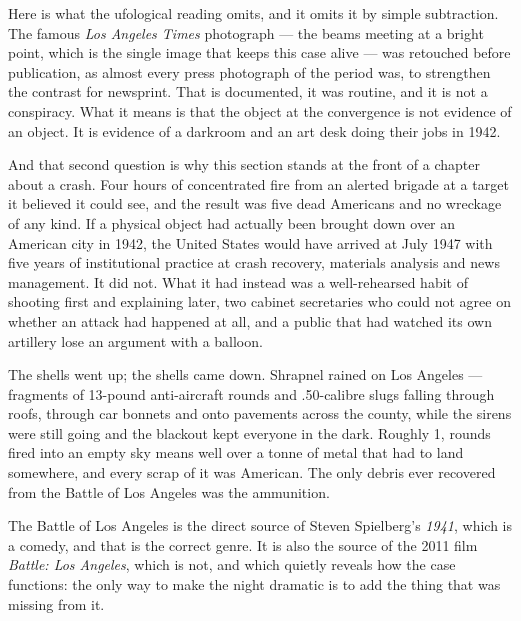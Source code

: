 Here is what the ufological reading omits, and it omits it by simple subtraction. The famous
\emph{Los Angeles Times} photograph --- the beams meeting at a bright point, which is the single
image that keeps this case alive --- was retouched before publication, as almost every press
photograph of the period was, to strengthen the contrast for newsprint. That is documented, it was
routine, and it is not a conspiracy. What it means is that the object at the convergence is not
evidence of an object. It is evidence of a darkroom and an art desk doing their jobs in 1942.


And that second question is why this section stands at the front of a chapter about a crash. Four
hours of concentrated fire from an alerted brigade at a target it believed it could see, and the
result was five dead Americans and no wreckage of any kind. If a physical object had actually been
brought down over an American city in 1942, the United States would have arrived at July 1947 with
five years of institutional practice at crash recovery, materials analysis and news management. It
did not. What it had instead was a well-rehearsed habit of shooting first and explaining later, two
cabinet secretaries who could not agree on whether an attack had happened at all, and a public that
had watched its own artillery lose an argument with a balloon. 

\begin{funfact}
The shells went up; the shells came down. Shrapnel rained on Los Angeles  ---
fragments of 13-pound anti-aircraft rounds and .50-calibre slugs falling through roofs, through car
bonnets and onto pavements across the county, while the sirens were still going and the blackout
kept everyone in the dark. Roughly 1, rounds fired into an empty sky means well over a tonne
of metal that had to land somewhere, and every scrap of it was American. The only debris ever
recovered from the Battle of Los Angeles was the ammunition.
\end{funfact}

\begin{funfact}
The Battle of Los Angeles is the direct source of Steven Spielberg's \emph{1941}, which is a
comedy, and that is the correct genre. It is also the source of the 2011 film \emph{Battle: Los
Angeles}, which is not, and which quietly reveals how the case functions: the only way to make the
night dramatic is to add the thing that was missing from it.
\end{funfact}

